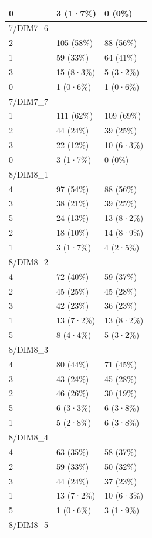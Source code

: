 \documentclass[
]{book}
\begin{document}
\begin{tabular}{l|l|l}
\hline
0 & 3 (1·7\%) & 0 (0\%)\\
\hline
7/DIM7\_6 &  & \\
\hline
2 & 105 (58\%) & 88 (56\%)\\
\hline
1 & 59 (33\%) & 64 (41\%)\\
\hline
3 & 15 (8·3\%) & 5 (3·2\%)\\
\hline
0 & 1 (0·6\%) & 1 (0·6\%)\\
\hline
7/DIM7\_7 &  & \\
\hline
1 & 111 (62\%) & 109 (69\%)\\
\hline
2 & 44 (24\%) & 39 (25\%)\\
\hline
3 & 22 (12\%) & 10 (6·3\%)\\
\hline
0 & 3 (1·7\%) & 0 (0\%)\\
\hline
8/DIM8\_1 &  & \\
\hline
4 & 97 (54\%) & 88 (56\%)\\
\hline
3 & 38 (21\%) & 39 (25\%)\\
\hline
5 & 24 (13\%) & 13 (8·2\%)\\
\hline
2 & 18 (10\%) & 14 (8·9\%)\\
\hline
1 & 3 (1·7\%) & 4 (2·5\%)\\
\hline
8/DIM8\_2 &  & \\
\hline
4 & 72 (40\%) & 59 (37\%)\\
\hline
2 & 45 (25\%) & 45 (28\%)\\
\hline
3 & 42 (23\%) & 36 (23\%)\\
\hline
1 & 13 (7·2\%) & 13 (8·2\%)\\
\hline
5 & 8 (4·4\%) & 5 (3·2\%)\\
\hline
8/DIM8\_3 &  & \\
\hline
4 & 80 (44\%) & 71 (45\%)\\
\hline
3 & 43 (24\%) & 45 (28\%)\\
\hline
2 & 46 (26\%) & 30 (19\%)\\
\hline
5 & 6 (3·3\%) & 6 (3·8\%)\\
\hline
1 & 5 (2·8\%) & 6 (3·8\%)\\
\hline
8/DIM8\_4 &  & \\
\hline
4 & 63 (35\%) & 58 (37\%)\\
\hline
2 & 59 (33\%) & 50 (32\%)\\
\hline
3 & 44 (24\%) & 37 (23\%)\\
\hline
1 & 13 (7·2\%) & 10 (6·3\%)\\
\hline
5 & 1 (0·6\%) & 3 (1·9\%)\\
\hline
8/DIM8\_5 &  & \\

\end{tabular}
\end{document}
